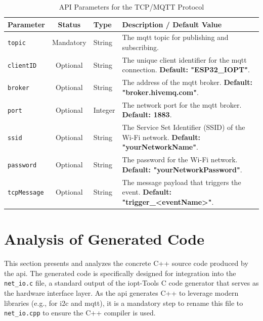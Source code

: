 \begin{table}[h!]
    \centering
    \caption{API Parameters for the TCP/MQTT Protocol}
    \label{tab:tcp_params}
    \begin{tabular}{|l|c|l|p{6cm}|}
        \hline
        \textbf{Parameter} & \textbf{Status} & \textbf{Type} & \textbf{Description / Default Value} \\ \hline
        \texttt{topic} & Mandatory & String & The \gls{mqtt} topic for publishing and subscribing. \\ \hline
        \texttt{clientID} & Optional & String & The unique client identifier for the \gls{mqtt} connection. \textbf{Default: "ESP32\_IOPT"}. \\ \hline
        \texttt{broker} & Optional & String & The address of the \gls{mqtt} broker. \textbf{Default: "broker.hivemq.com"}. \\ \hline
        \texttt{port} & Optional & Integer & The network port for the \gls{mqtt} broker. \textbf{Default: 1883}. \\ \hline
        \texttt{ssid} & Optional & String & The Service Set Identifier (SSID) of the Wi-Fi network. \textbf{Default: "yourNetworkName"}. \\ \hline
        \texttt{password} & Optional & String & The password for the Wi-Fi network. \textbf{Default: "yourNetworkPassword"}. \\ \hline
        \texttt{tcpMessage} & Optional & String & The message payload that triggers the event. \textbf{Default: "trigger\_<eventName>"}. \\ \hline
    \end{tabular}
\end{table}




\section{Analysis of Generated Code}
\label{sec:analysis_of_code}

This section presents and analyzes the concrete C++ source code produced by the \gls{api}. The generated code is specifically designed for integration into the \texttt{net\_io.c} file, a standard output of the \gls{iopt}-Tools C code generator that serves as the hardware interface layer. As the \gls{api} generates C++ to leverage modern libraries (e.g., for \gls{i2c} and \gls{mqtt}), it is a mandatory step to rename this file to \texttt{net\_io.cpp} to ensure the C++ compiler is used.

